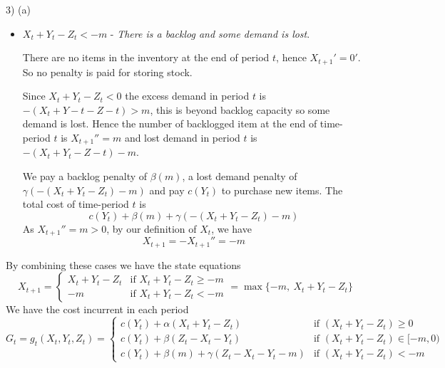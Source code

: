 \documentclass[11pt,a4paper]{article}
\begin{document}
\begin{answer}{3) (a)}
\begin{itemize}
\begin{itemize}
      \item $X_t+Y_t-Z_t<-m$ -\textit{ There is a backlog and some demand is lost}.
      \par There are no items in the inventory at the end of period $t$, hence $X_{t+1}'=0'$. So no penalty is paid for storing stock.
      \par Since $X_t+Y_t-Z_t<0$ the excess demand in period $t$ is $-(X_t+Y-t-Z-t)>m$, this is beyond backlog capacity so some demand is lost. Hence the number of backlogged item at the end of time-period $t$ is $X_{t+1}''=m$ and lost demand in period $t$ is $-(X_t+Y_t-Z-t)-m$.
      \par We pay a backlog penalty of $\beta(m)$, a lost demand penalty of $\gamma(-(X_t+Y_t-Z_t)-m)$ and pay $c(Y_t)$ to purchase new items. The total cost of time-period $t$ is
      \[ c(Y_t)+\beta(m)+\gamma(-(X_t+Y_t-Z_t)-m) \]
      As $X_{t+1}''=m>0$, by our definition of $X_t$, we have
      \[ X_{t+1}=-X_{t+1}''=-m \]
    \end{itemize}
    By combining these cases we have the state equations
    \[ X_{t+1}=\begin{cases}X_t+Y_t-Z_t&\text{if }X_t+Y_t-Z_t\geq-m\\-m&\text{if }X_t+Y_t-Z_t<-m\end{cases}=\max\{-m,\ X_t+Y_t-Z_t\} \]
    We have the cost incurrent in each period
    \[ G_t=g_t(X_t,Y_t,Z_t)=\begin{cases}
      c(Y_t)+\alpha(X_t+Y_t-Z_t)&\text{if }(X_t+Y_t-Z_t)\geq0\\
      c(Y_t)+\beta(Z_t-X_t-Y_t)&\text{if }(X_t+Y_t-Z_t)\in[-m,0)\\
      c(Y_t)+\beta(m)+\gamma(Z_t-X_t-Y_t-m)&\text{if }(X_t+Y_t-Z_t)<-m
    \end{cases} \]


\end{itemize}
\end{answer}
\end{document}
